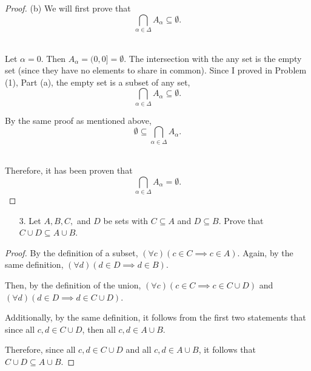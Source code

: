 \documentclass[10pt]{article}
\theoremstyle{definition}
\theoremstyle{plain}
\begin{document}
\begin{proof}{(b)}
  We will first prove that $$\bigcap_{\alpha \in \Delta} A_\alpha \subseteq \emptyset.$$ \\

  \par Let $\alpha=0$. Then $A_\alpha = (0,0] = \emptyset$. The intersection with the any set is the empty set (since they have no elements to share in common). Since I proved in Problem (1), Part (a), the empty set is a subset of any set, $$\bigcap_{\alpha \in \Delta} A_\alpha \subseteq \emptyset.$$

  \par By the same proof as mentioned above, $$\emptyset \subseteq \bigcap_{\alpha \in \Delta} A_\alpha.$$ \\

  \par Therefore, it has been proven that $$\bigcap_{\alpha \in \Delta} A_\alpha = \emptyset.$$
\end{proof}



\pagebreak



\begin{enumerate}
  \item[3.] Let $A, B, C,$ and $D$ be sets with $C \subseteq A$ and $D \subseteq B$.  Prove that $C \cup D \subseteq A \cup B$.
\end{enumerate}

\begin{proof}
  By the definition of a subset, $(\forall c)(c\in C \implies c\in A)$. Again, by the same definition, $(\forall d) (d\in D \implies d\in B)$. \\

  \par Then, by the definition of the union, $(\forall c)(c\in C \implies c\in C\cup D)$ and $(\forall d)(d\in D\implies d\in C\cup D)$. \\

  \par Additionally, by the same definition, it follows from the first two statements that since all $c,d\in C\cup D$, then all $c,d \in A\cup B$. \\

  \par Therefore, since all $c,d\in C\cup D$ and all $c,d \in A\cup B$, it follows that $C\cup D \subseteq A\cup B$.
\end{proof}
\end{document}
